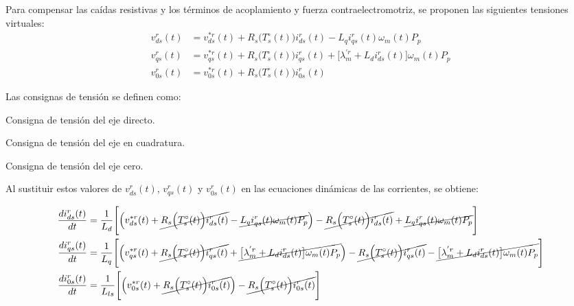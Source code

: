 \documentclass[blue,fullpaper]{ludusofficial}  %
\begin{document}
Para compensar las caídas resistivas y los términos de acoplamiento y fuerza contraelectromotriz, se proponen las siguientes tensiones virtuales:
\begin{align}
v_{ds}^{r}(t) & = v_{ds}^{*r}(t) + R_{s} \Big( T_{s}^{\circ} (t) \Big) i_{ds}^{r}(t) - L_{q}i_{qs}^{r}(t) \omega_{m}(t)P_{p}    \\
v_{qs}^{r}(t) & = v_{qs}^{*r}(t) + R_{s} \Big( T_{s}^{\circ} (t) \Big) i_{qs}^{r}(t) + \big[ \lambda_{m}^{'r} + L_{d} i_{ds}^{r}(t) \big] \omega_{m}(t)P_{p}  \\
v_{0s}^{r}(t) & = v_{0s}^{*r}(t) + R_{s} \Big( T_{s}^{\circ} (t) \Big) i_{0s}^{r}(t) 
\end{align}

\noindent Las consignas de tensión se definen como:
\begin{description}[leftmargin=1.2cm, labelwidth=1cm]
    \item[$v_{ds}^{*r}(t)$] Consigna de tensión del eje directo.
    \item[$v_{qs}^{*r}(t)$] Consigna de tensión del eje en cuadratura.
    \item[$v_{0s}^{*r}(t)$] Consigna de tensión del eje cero.
\end{description}

Al sustituir estos valores de $v_{ds}^{r}(t)$, $v_{qs}^{r}(t)$ y $v_{0s}^{r}(t)$ en las ecuaciones dinámicas de las corrientes, se obtiene:

\begin{align*}
\frac{di_{ds}^{r}(t)}{dt} & = \frac{1}{L_{d}} \Bigg[ \Big( v_{ds}^{*r}(t) + \cancel{ R_{s} \Big( T_{s}^{\circ} (t) \Big) i_{ds}^{r}(t) } - \cancel{ L_{q}i_{qs}^{r}(t) \omega_{m}(t)P_{p} } \Big) - \cancel{ R_{s} \Big( T_{s}^{\circ} (t) \Big) i_{ds}^{r}(t) } + \cancel{ L_{q}i_{qs}^{r}(t) \omega_{m}(t)P_{p}  } \Bigg]  \\
\frac{di_{qs}^{r}(t)}{dt}  & = \frac{1}{L_{q} } \Bigg[ \Big( v_{qs}^{*r}(t) +\cancel{  R_{s} \Big( T_{s}^{\circ} (t) \Big) i_{qs}^{r}(t) } +\cancel{  \big[ \lambda_{m}^{'r} + L_{d} i_{ds}^{r}(t) \big] \omega_{m}(t)P_{p}  } \Big) - \cancel{ R_{s} \Big( T_{s}^{\circ} (t) \Big) i_{qs}^{r}(t) } - \cancel{ \big[ \lambda_{m}^{'r} + L_{d} i_{ds}^{r}(t) \big] \omega_{m}(t)P_{p}  }\Bigg]  \\
\frac{di_{0s}^{r}(t)}{dt} & = \frac{1}{ L_{ls} } \Bigg[ \Big( v_{0s}^{*r}(t) + \cancel{ R_{s} \Big( T_{s}^{\circ} (t) \Big) i_{0s}^{r}(t) }  \Big) -\cancel{  R_{s} \Big( T_{s}^{\circ} (t) \Big) i_{0s}^{r}(t) } \Bigg]
\end{align*}
\end{document}
